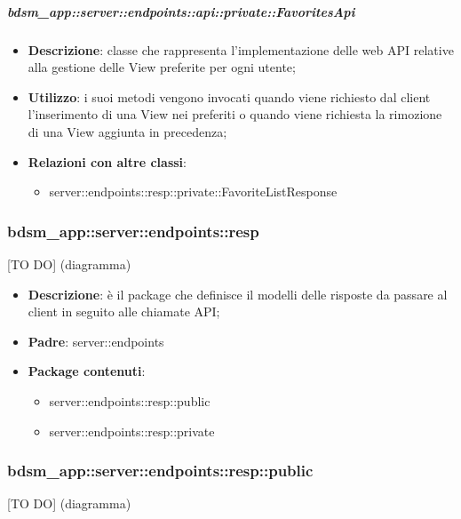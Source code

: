     \subparagraph{bdsm\_app::server::endpoints::api::private::FavoritesApi} %
    \label{subp:bdsm_app_server_endpoints_api_private_favoritesapi}
    \begin{itemize}
      \item \textbf{Descrizione}: classe che rappresenta l'implementazione delle web API relative alla gestione delle View preferite per ogni utente;
      \item \textbf{Utilizzo}: i suoi metodi vengono invocati quando viene richiesto dal client l'inserimento di una View nei preferiti o quando viene richiesta la rimozione di una View aggiunta in precedenza;
      \item \textbf{Relazioni con altre classi}:
        \begin{itemize}
          \item server::endpoints::resp::private::FavoriteListResponse
        \end{itemize}
      \end{itemize}

\subsubsection{bdsm\_app::server::endpoints::resp} %
\label{ssub:bdsm_app_server_endpoints_resp}
[TO DO] (diagramma) \newline \newline

\begin{itemize}
  \item \textbf{Descrizione}: è il package che definisce il modelli delle risposte da passare al client in seguito alle chiamate API;
  \item \textbf{Padre}: server::endpoints
  \item \textbf{Package contenuti}:
  	\begin{itemize}
  		\item server::endpoints::resp::public
  		\item server::endpoints::resp::private
	\end{itemize}
\end{itemize}

\subsubsection{bdsm\_app::server::endpoints::resp::public} %
\label{ssub:bdsm_app_server_endpoints_resp_public}
[TO DO] (diagramma) \newline \newline

